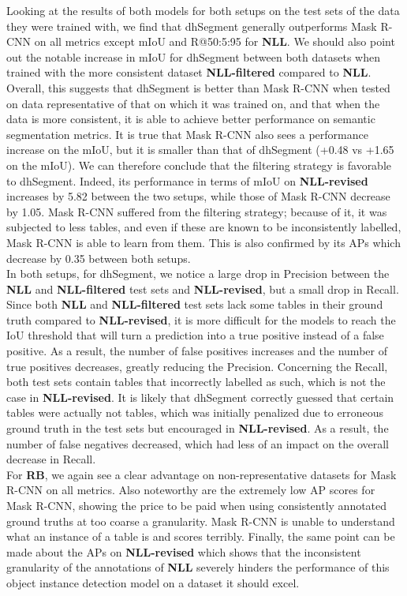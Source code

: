 Looking at the results of both models for both setups on the test sets of the data they were trained with, we find that dhSegment generally outperforms Mask R-CNN on all metrics except mIoU and R@50:5:95 for \textbf{NLL}. We should also point out the notable increase in mIoU for dhSegment between both datasets when trained with the more consistent dataset \textbf{NLL-filtered} compared to \textbf{NLL}. Overall, this suggests that dhSegment is better than Mask R-CNN when tested on data representative of that on which it was trained on, and that when the data is more consistent, it is able to achieve better performance on semantic segmentation metrics. It is true that Mask R-CNN also sees a performance increase on the mIoU, but it is smaller than that of dhSegment (+0.48 vs +1.65 on the mIoU). We can therefore conclude that the filtering strategy is favorable to dhSegment. Indeed, its performance in terms of mIoU on \textbf{NLL-revised} increases by 5.82 between the two setups, while those of Mask R-CNN decrease by 1.05. Mask R-CNN suffered from the filtering strategy; because of it, it was subjected to less tables, and even if these are known to be inconsistently labelled, Mask R-CNN is able to learn from them. This is also confirmed by its APs which decrease by 0.35 between both setups. \\
In both setups, for dhSegment, we notice a large drop in Precision between the \textbf{NLL} and \textbf{NLL-filtered} test sets and \textbf{NLL-revised}, but a small drop in Recall. Since both \textbf{NLL} and \textbf{NLL-filtered} test sets lack some tables in their ground truth compared to \textbf{NLL-revised}, it is more difficult for the models to reach the IoU threshold that will turn a prediction into a true positive instead of a false positive. As a result, the number of false positives increases and the number of true positives decreases, greatly reducing the Precision. Concerning the Recall, both test sets contain tables that incorrectly labelled as such, which is not the case in \textbf{NLL-revised}. It is likely that dhSegment correctly guessed that certain tables were actually not tables, which was initially penalized due to erroneous ground truth in the test sets but encouraged in \textbf{NLL-revised}. As a result, the number of false negatives decreased, which had less of an impact on the overall decrease in Recall.\\
For \textbf{RB}, we again see a clear advantage on non-representative datasets for Mask R-CNN on all metrics. Also noteworthy are the extremely low AP scores for Mask R-CNN, showing the price to be paid when using consistently annotated ground truths at too coarse a granularity. Mask R-CNN is unable to understand what an instance of a table is and scores terribly. Finally, the same point can be made about the APs on \textbf{NLL-revised} which shows that the inconsistent granularity of the annotations of \textbf{NLL} severely hinders the performance of this object instance detection model on a dataset it should excel. \\
